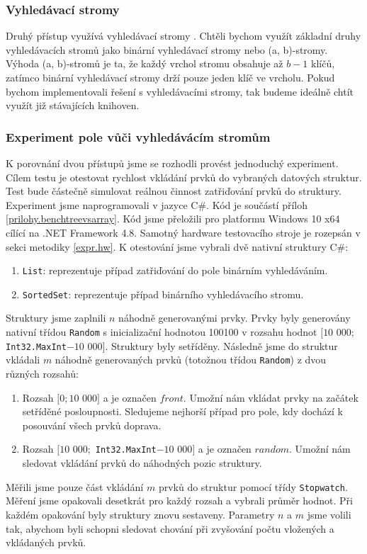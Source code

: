 \subsubsection{Vyhledávací stromy}

Druhý přístup využívá vyhledávací stromy \citep[str. 177]{labyrint}.
Chtěli bychom využít základní druhy vyhledávacích stromů jako binární vyhledávací stromy nebo (a, b)-stromy.
Výhoda (a, b)-stromů je ta, že každý vrchol stromu obsahuje až $b-1$ klíčů, zatímco binární vyhledávací stromy drží pouze jeden klíč ve vrcholu.
Pokud bychom implementovali řešení s vyhledávacími stromy, tak budeme ideálně chtít využít již stávajících knihoven.

\subsubsection{Experiment pole vůči vyhledávácím stromům}

K porovnání dvou přístupů jsme se rozhodli provést jednoduchý experiment.
Cílem testu je otestovat rychlost vkládání prvků do vybraných datových struktur.
Test bude částečně simulovat reálnou činnost zatřiďování prvků do struktury.
Experiment jsme naprogramovali v jazyce C\#.
Kód je součástí příloh \ref{prilohy.benchtreevsarray}.
Kód jsme přeložili pro platformu Windows 10 x64 cílící na .NET Framework 4.8.
Samotný hardware testovacího stroje je rozepsán v sekci metodiky \ref{expr.hw}.
K otestování jsme vybrali dvě nativní struktury C\#:

\begin{enumerate}
\item \texttt{List}: reprezentuje případ zatřiďování do pole binárním vyhledáváním.
\item \texttt{SortedSet}: reprezentuje případ binárního vyhledávacího stromu.
\end{enumerate}
Struktury jsme zaplnili $n$ náhodně generovanými prvky.
Prvky byly generovány nativní třídou \texttt{Random} s inicializační hodnotou 100100 v rozsahu hodnot $[10$ $000; $\texttt{Int32.MaxInt}$ - 10$ $000]$.
Struktury byly setříděny.
Následně jsme do struktur vkládali $m$ náhodně generovaných prvků (totožnou třídou \texttt{Random}) z dvou různých rozsahů:

\begin{enumerate}
\item Rozsah $[0; 10$ $000]$ a je označen $front$. 
Umožní nám vkládat prvky na začátek setříděné posloupnosti. 
Sledujeme nejhorší případ pro pole, kdy dochází k posouvání všech prvků doprava.
\item Rozsah $[10$ $000;$ \texttt{Int32.MaxInt}$ - 10$ $000]$ a je označen $random$.
Umožní nám sledovat vkládání prvků do náhodných pozic struktury.
\end{enumerate}
Měřili jsme pouze část vkládání $m$ prvků do struktur pomocí třídy \texttt{Stopwatch}.
Měření jsme opakovali desetkrát pro každý rozsah a vybrali průměr hodnot.
Při každém opakování byly struktury znovu sestaveny.
Parametry $n$ a $m$ jsme volili tak, abychom byli schopni sledovat chování při zvyšování počtu vložených a vkládaných prvků. 


